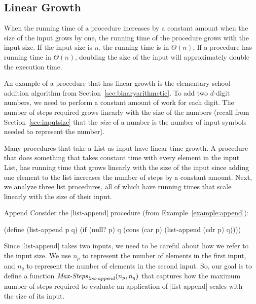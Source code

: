 \begin{schemeregion}
\subsection{Linear Growth}\label{sec:linear}

When the running time of a procedure increases by a constant amount when the size of the input grows by one, the running time of the procedure grows  with the input size.  If the input size is $n$, the running time is in $\Theta(n)$.  If a procedure has running time in $\Theta(n)$, doubling the size of the input will approximately double the execution time.

An example of a procedure that has linear growth is the elementary school addition algorithm from Section~\ref{sec:binaryarithmetic}.  To add two $d$-digit numbers, we need to perform a constant amount of work for each digit.  The number of steps required grows linearly with the size of the numbers (recall from Section~\ref{sec:inputsize} that the \emph{size} of a number is the number of input symbols needed to represent the number).

Many procedures that take a List as input have linear time growth.  A procedure that does something that takes constant time with every element in the input List, has running time that grows linearly with the size of the input since adding one element to the list increases the number of steps by a constant amount.  Next, we analyze three list procedures, all of which have running times that scale linearly with the size of their input.

\begin{examplenobar}{Append}\label{example:time-list-append} Consider the \scheme|list-append| procedure (from Example~\ref{example:append}):
\begin{schemedisplay}
(define (list-append p q)
  (if (null? p) q (cons (car p) (list-append (cdr p) q))))
\end{schemedisplay}

Since \scheme|list-append| takes two inputs, we need to be careful about how we refer to the input size.  We use $n_p$ to represent the number of elements in the first input, and $n_q$ to represent the number of elements in the second input.  So, our goal is to define a function $\textrm{\emph{Max-Steps}}_{\textrm{\emph{list-append}}}(n_p, n_q)$ that captures how the maximum number of steps required to evaluate an application of \scheme|list-append| scales with the size of its input.


\end{examplenobar}
\end{schemeregion}
